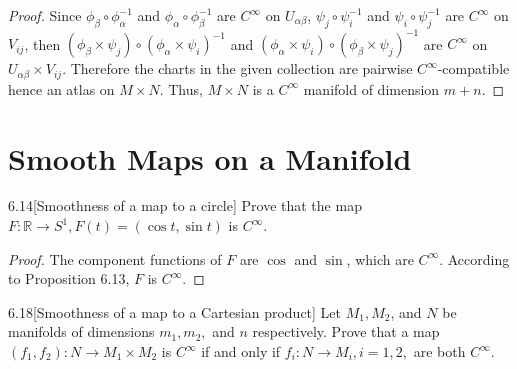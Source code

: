 \begin{proof}
	Since \( \phi_{\beta} \circ \phi_{\alpha}^{-1} \) and \( \phi_{\alpha} \circ \phi_{\beta}^{-1} \) are \( C^{\infty} \) on \( U_{\alpha\beta} \), \( \psi_{j} \circ \psi_{i}^{-1} \) and \( \psi_{i} \circ \psi_{j}^{-1} \) are \( C^{\infty} \) on \( V_{ij} \), then \( {(\phi_{\beta} \times \psi_{j})} \circ {(\phi_{\alpha} \times \psi_{i})}^{-1} \) and \( {(\phi_{\alpha} \times \psi_{i})} \circ {(\phi_{\beta} \times \psi_{j})}^{-1} \) are \( C^{\infty} \) on \( U_{\alpha\beta} \times V_{ij} \). Therefore the charts in the given collection are pairwise \( C^{\infty} \)-compatible hence an atlas on \( M\times N \). Thus, \( M\times N \) is a \( C^{\infty} \) manifold of dimension \( m + n \).
\end{proof}

\section{Smooth Maps on a Manifold}

\begin{exercise}{6.14}[Smoothness of a map to a circle]
	Prove that the map \( F: \mathbb{R} \to S^{1}, F(t) = (\cos t, \sin t) \) is \( C^{\infty} \).
\end{exercise}

\begin{proof}
	The component functions of \( F \) are \( \cos \) and \( \sin \), which are \( C^{\infty} \). According to Proposition 6.13, \( F \) is \( C^{\infty} \).
\end{proof}

\begin{exercise}{6.18}[Smoothness of a map to a Cartesian product]\label{exercise:6.18}
	Let \( M_{1}, M_{2} \), and \( N \) be manifolds of dimensions \( m_{1}, m_{2}, \) and \( n \) respectively. Prove that a map \( (f_{1}, f_{2}): N \to M_{1} \times M_{2} \) is \( C^{\infty} \) if and only if \( f_{i}: N \to M_{i}, i = 1, 2, \) are both \( C^{\infty} \).
\end{exercise}


